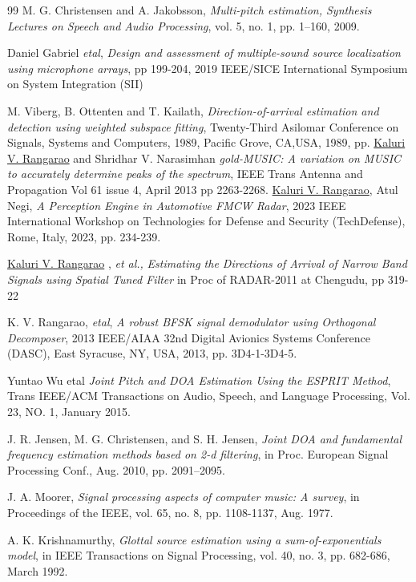 \begin{thebibliography}{99}
M. G. Christensen and A. Jakobsson, 
{\em Multi-pitch estimation, Synthesis Lectures on Speech and Audio Processing}, 
vol. 5, no. 1, pp. 1–160, 2009.

Daniel Gabriel {\em etal}, {\em Design and assessment of multiple-sound source localization using microphone arrays}, pp 199-204, 2019 IEEE/SICE International Symposium on System Integration (SII)	

M. Viberg, B. Ottenten and T. Kailath, {\em Direction-of-arrival estimation and detection using weighted subspace fitting}, Twenty-Third Asilomar Conference on Signals, Systems and Computers, 1989, Pacific Grove, CA,USA, 1989, pp. 	
\href{http://ieeexplore.ieee.org/document/6376104/}{Kaluri V. Rangarao}
and Shridhar V. Narasimhan
{\em gold-MUSIC: A variation on MUSIC to accurately determine peaks of the spectrum},
IEEE Trans Antenna and Propagation Vol 61 issue 4, April 2013 pp 2263-2268.
{\href{https://ieeexplore.ieee.org/document/10380840}{Kaluri V. Rangarao}}, 
Atul Negi, {\em A Perception Engine in Automotive FMCW Radar}, 
2023 IEEE International Workshop on Technologies for Defense and Security (TechDefense), 
Rome, Italy, 2023, pp. 234-239.

\href{http://ieeexplore.ieee.org/document/6159541/}{Kaluri V. Rangarao}
, {\em et al.,}
{\em Estimating the Directions of Arrival of Narrow
	Band Signals using Spatial Tuned Filter} in
Proc of RADAR-2011 at Chengudu, pp 319-22

K. V. Rangarao, {\em etal}, {\em A robust BFSK signal demodulator using Orthogonal Decomposer}, 2013 IEEE/AIAA 32nd Digital Avionics Systems Conference (DASC), East Syracuse, NY, USA, 2013, pp. 3D4-1-3D4-5.


Yuntao Wu etal {\em Joint Pitch and DOA Estimation Using the ESPRIT Method}, 
Trans IEEE/ACM Transactions on Audio, Speech, and Language Processing, Vol. 23, NO. 1, January 2015.

J. R. Jensen, M. G. Christensen, and S. H. Jensen, {\em Joint 	DOA and fundamental frequency estimation methods based on 2-d filtering}, in Proc. European Signal Processing Conf., Aug. 2010, pp. 2091–2095.

J. A. Moorer, {\em Signal processing aspects of computer music: A survey}, 
in Proceedings of the IEEE, vol. 65, no. 8, pp. 1108-1137, Aug. 1977.

A. K. Krishnamurthy, {\em Glottal source estimation using a sum-of-exponentials model}, in IEEE Transactions on Signal Processing, vol. 40, no. 3, pp. 682-686, March 1992.


\end{thebibliography}
